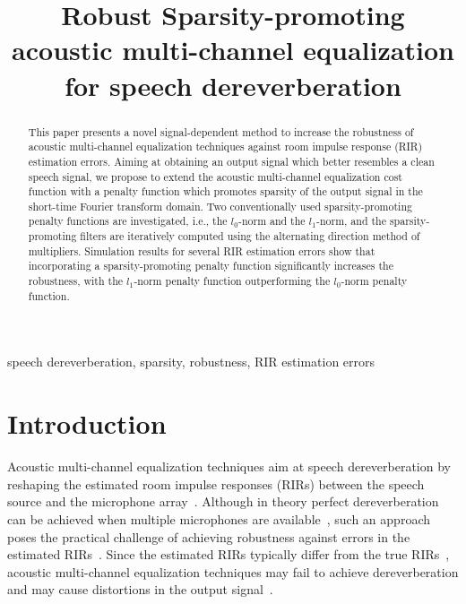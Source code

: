 \documentclass{article}
\title{Robust Sparsity-promoting acoustic multi-channel equalization \\ for speech dereverberation}
\def\ninept{\def\baselinestretch{.9}\let\normalsize\small\normalsize}
\begin{document}
\newlength\figureheight
\newlength\figurewidth
\setlength\figureheight{2cm}
\setlength{}
\ninept
%
\maketitle
%
\begin{abstract}
This paper presents a novel signal-dependent method to increase the robustness of acoustic multi-channel equalization  techniques against room impulse response (RIR) estimation errors.
Aiming at obtaining an output signal which better resembles a clean speech signal, we propose to extend the acoustic multi-channel equalization cost function with a penalty function which promotes sparsity of the output signal in the short-time Fourier transform domain.
Two conventionally used sparsity-promoting penalty functions are investigated, i.e., the $l_0$-norm and the $l_1$-norm, and the sparsity-promoting filters are iteratively computed using the alternating direction method of multipliers.
Simulation results for several RIR estimation errors show that incorporating a sparsity-promoting penalty function significantly increases the robustness, with the $l_1$-norm penalty function outperforming the $l_0$-norm penalty function.

\end{abstract}
%
\begin{keywords}
speech dereverberation, sparsity, robustness, RIR estimation errors
\end{keywords}
%
\section{Introduction}
\label{sec: intro}
Acoustic multi-channel equalization techniques aim at speech dereverberation by reshaping the estimated room impulse responses (RIRs) between the speech source and the microphone array~\cite{Miyoshi_ITASS_1988,Kallinger_ICASSP_2006,Kodrasi_ITASLP_2013,Lim_ITASLP_2014}.
Although in theory perfect dereverberation can be achieved when multiple microphones are available~\cite{Miyoshi_ITASS_1988}, such an approach poses the practical challenge of achieving robustness against errors in the estimated RIRs~\cite{Hikichi_EURASIP_2007,Kodrasi_ITASLP_2013,Lim_ITASLP_2014}. 
Since the estimated RIRs typically differ from the true RIRs~\cite{Radlovic_ITSA_2000,Hasan_EUSIPCO_2006}, acoustic multi-channel equalization techniques may fail to achieve dereverberation and may cause distortions in the output signal~\cite{Radlovic_ITSA_2000,Kodrasi_ITASLP_2013}. 
\end{document}
